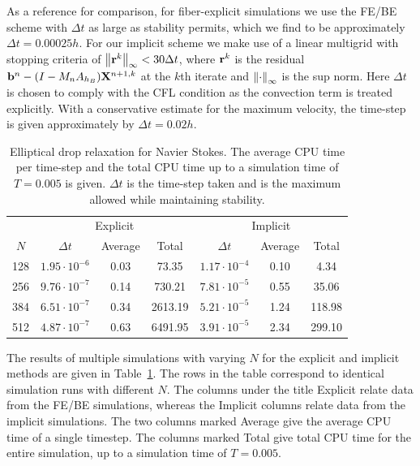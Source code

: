 As a reference for comparison, for fiber-explicit simulations we use the FE/BE scheme 
 with $\Delta t$ as large as  stability permits, which we find to be approximately $\Delta t = 0.00025h$. For our implicit scheme we make use of a linear multigrid with stopping criteria of $\left\lVert\mathbf{r}^k\right\rVert_{\infty}<30\Delta t$, where $\mathbf{r}^k$ is the residual $\mathbf{b}^n-(I-M_n A_{h_B})\mathbf{X}^{n+1,k}$ at the $k$th iterate and $\left\lVert\cdot\right\rVert_{\infty}$ is the sup norm. Here $\Delta t$ is 
 chosen to comply with the CFL condition as the convection term is treated explicitly. With a conservative estimate for the maximum 
 velocity, the time-step is given approximately by $\Delta t = 0.02h$. 
 \begin{table}
\caption{Elliptical drop relaxation for Navier Stokes. The average CPU time per time-step and the total CPU time up to a simulation time of $T=0.005$ is given. $\Delta t$ is the time-step taken and is the maximum allowed while maintaining stability.}
\label{table:EllipseConvectiveSims}
\begin{center}
\begin{tabular}{|c |c c c| c c c|}
\hline
& \multicolumn{3}{c|}{Explicit} & \multicolumn{3}{c|}{Implicit}\\
$N$ & $\Delta t$ & Average & Total & $\Delta t$ & Average & Total\\
\hline
128 & $1.95\cdot 10^{-6}$ & 0.03 & 73.35 & $1.17\cdot 10^{-4}$ & 0.10 & 4.34 \\
256 & $9.76\cdot 10^{-7}$ & 0.14 & 730.21 & $7.81\cdot 10^{-5}$ & 0.55 & 35.06\\
384 & $6.51\cdot 10^{-7}$ & 0.34 & 2613.19 & $5.21\cdot 10^{-5}$ & 1.24 & 118.98\\
512 & $4.87\cdot 10^{-7}$ & 0.63 & 6491.95 & $3.91\cdot 10^{-5}$ & 2.34 & 299.10\\
\hline
\end{tabular}
\end{center}
\end{table}

The results of multiple simulations with varying $N$ for the explicit and implicit methods are given in 
Table~\ref{table:EllipseConvectiveSims}. The rows in the table correspond to identical simulation runs with different $N$. The columns under the title Explicit relate data from the FE/BE simulations, whereas the Implicit columns relate data from the implicit simulations. The two columns marked Average give the average CPU time of a single timestep. The columns marked Total give total CPU time for the entire simulation, up to a simulation time of $T=0.005$.



